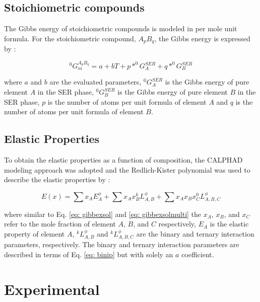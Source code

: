 \subsection{Stoichiometric compounds}

The Gibbs energy of stoichiometric compounds is modeled in per mole unit formula. For the stoichiometric compound, $A_{p}B_{q}$, the Gibbs energy is expressed by \cite{Zacherl2012}: 

\begin{equation}
\label{eq: stoichiometric}
^{0}G_{m}^{A_{p}B_{q}} = a + bT + p * ^{0}G_{A}^{SER} + q * ^{0}G_{B}^{SER}
\end{equation}

\noindent where $a$ and $b$ are the evaluated parameters, $^{0}G_{A}^{SER}$ is the Gibbs energy of pure element $A$ in the SER phase, $^{0}G_{B}^{SER}$ is the Gibbs energy of pure element $B$ in the SER phase, $p$ is the number of atoms per unit formula of element $A$ and $q$ is the number of atoms per unit formula of element $B$.

\subsection{Elastic Properties}

To obtain the elastic properties as a function of composition, the CALPHAD modeling approach was adopted and the Redlich-Kister polynomial was used to describe the elastic properties by \cite{Redlich1948b,Shang2010c}: 

\begin{equation}
\label{eq: elastic}
E(x) = \sum x_{A} E_{A}^{\phi} + \sum x_{A} x_{B} ^{k}L_{A,B}^{\phi} + \sum x_{A} x_{B} x_{C} ^{0}L_{A, B, C}^{\phi}
\end{equation}

\noindent where similar to Eq. \ref{eq: gibbexsol} and \ref{eq: gibbexsolmulti} the $x_A$, $x_B$, and $x_C$ refer to the mole fraction of element $A$, $B$, and $C$ respectively, $E_{A}$ is the elastic property of element $A$, $^{k}L_{A,B}^{\phi}$ and $^{k}L_{A,B,C}^{\phi}$ are the binary and ternary interaction parameters, respectively. The binary and ternary interaction parameters are described in terms of Eq. \ref{eq: binip} but with solely an $a$ coefficient. 

\section{Experimental}

